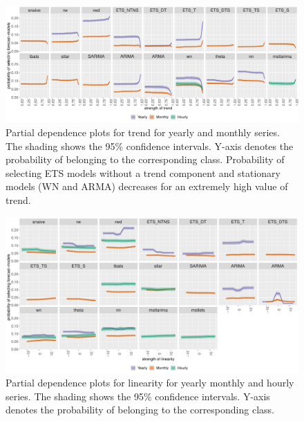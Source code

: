 \documentclass[11pt,a4paper,]{article}
\begin{document}
\begin{figure}[h]

{\centering \includegraphics[width=\textwidth]{figure/pdpyearlytrend-1} 

}

\caption{Partial dependence plots for trend for yearly and monthly series. The shading shows the 95\% confidence intervals. Y-axis denotes the probability of belonging to the corresponding class. Probability of selecting ETS models without a trend component and stationary models (WN and ARMA) decreases for an extremely high value of trend.}\label{fig:pdpyearlytrend}
\end{figure}

\begin{figure}[h]

{\centering \includegraphics[width=\textwidth]{figure/linearity-1} 

}

\caption{Partial dependence plots for linearity for yearly monthly and hourly series. The shading shows the 95\% confidence intervals. Y-axis denotes the probability of belonging to the corresponding class. }\label{fig:linearity}
\end{figure}
\end{document}
